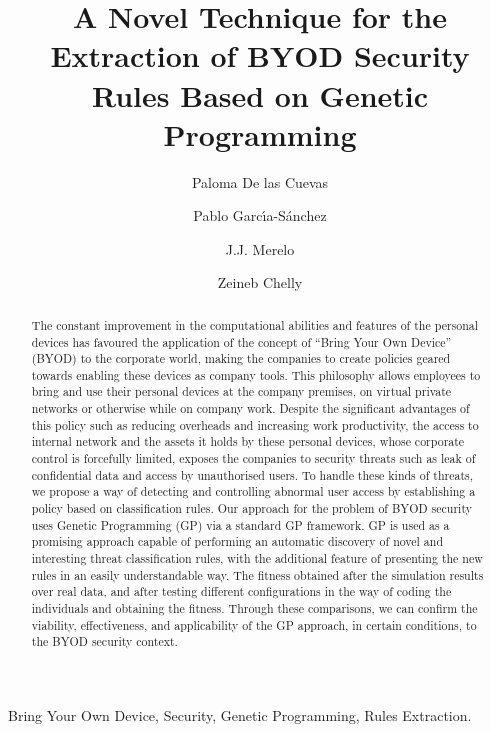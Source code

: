 \documentclass[a4paper,10pt,twocolumn,preprint,3p]{elsarticle}
\begin{document}
\begin{frontmatter}

\title{A Novel Technique for the Extraction of BYOD Security Rules Based on Genetic Programming}

\author[ugr]{Paloma De las Cuevas}
\author[uca]{Pablo Garc\'{\i}a-S\'anchez}
\author[ugr]{J.J. Merelo}
\author[isgt]{Zeineb Chelly}

\address[ugr]{Department of Computer Architecture and Computer Technology, ETSIIT and CITIC \\
University of Granada, Granada, Spain. Tel: +34958241778. Fax: +34958248993}
\address[uca]{Department of Computer Engineering, School of Engineering \\
University of C\'adiz, Spain.}
\address[isgt]{LARODEC, Institut Sup\'erieur de Gestion de Tunis, Tunisia.}


\begin{abstract}
The constant improvement in the computational abilities and features of the personal devices has favoured the application of the concept of ``Bring Your Own Device'' (BYOD) to the corporate world, making the companies to
create policies geared towards enabling these devices as company tools. 
This philosophy allows
employees to bring and use their personal devices at
the company premises, on virtual private networks or otherwise while
on company work. Despite the significant advantages of this policy
such as reducing overheads and increasing work productivity, 
the
access to internal network and the assets it holds by these personal
devices, whose corporate control is forcefully limited, exposes the companies to
security threats such as leak of confidential data and access by
unauthorised users. 
To handle these kinds of threats, we propose a way of detecting and controlling abnormal user
access by establishing a policy based on classification rules. Our
approach for the problem of BYOD security uses Genetic Programming
(GP) via a standard GP framework. GP is used as a promising approach 
capable of performing an automatic discovery of novel and interesting
threat classification rules, with the additional feature of presenting
the new rules in an easily understandable way. The fitness obtained after the simulation results over real data, and after testing different configurations in the way of coding the individuals and obtaining the fitness. Through these comparisons, we can confirm the
viability, effectiveness, and applicability of the GP approach, in certain conditions, to the
BYOD security context.
\end{abstract}


\begin{keyword}
Bring Your Own Device, Security, Genetic Programming, Rules Extraction. 
\end{keyword}

\end{frontmatter}
\end{document}
